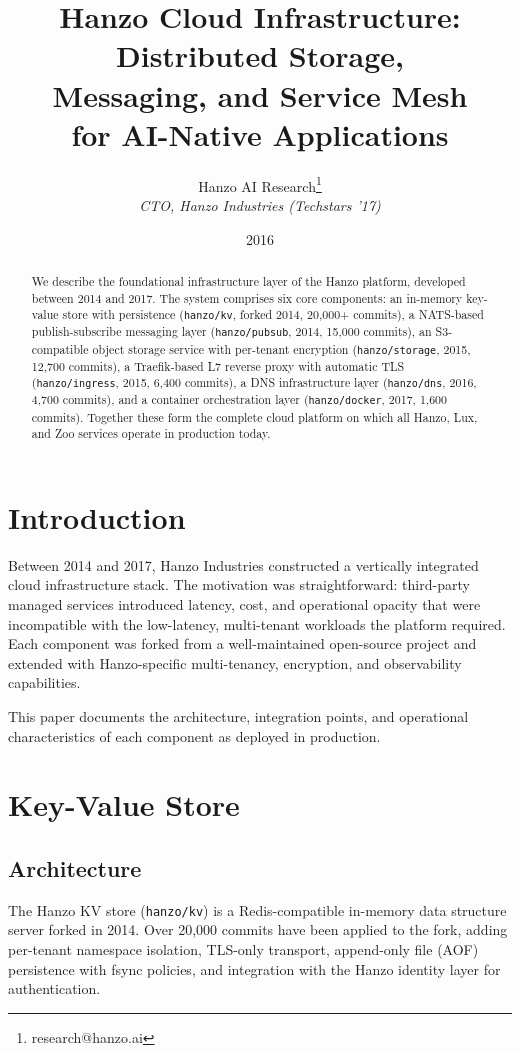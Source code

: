 \documentclass[11pt,a4paper]{article}
\title{Hanzo Cloud Infrastructure: Distributed Storage,\\Messaging, and Service Mesh\\for AI-Native Applications}
\author{Hanzo AI Research\thanks{research@hanzo.ai} \\ \textit{CTO, Hanzo Industries (Techstars '17)}}
\date{2016}
\begin{document}
\hanzocoverpage

\begin{abstract}
We describe the foundational infrastructure layer of the Hanzo platform, developed between 2014 and 2017. The system comprises six core components: an in-memory key-value store with persistence (\texttt{hanzo/kv}, forked 2014, 20{,}000+ commits), a NATS-based publish-subscribe messaging layer (\texttt{hanzo/pubsub}, 2014, 15{,}000 commits), an S3-compatible object storage service with per-tenant encryption (\texttt{hanzo/storage}, 2015, 12{,}700 commits), a Traefik-based L7 reverse proxy with automatic TLS (\texttt{hanzo/ingress}, 2015, 6{,}400 commits), a DNS infrastructure layer (\texttt{hanzo/dns}, 2016, 4{,}700 commits), and a container orchestration layer (\texttt{hanzo/docker}, 2017, 1{,}600 commits). Together these form the complete cloud platform on which all Hanzo, Lux, and Zoo services operate in production today.
\end{abstract}

\section{Introduction}

Between 2014 and 2017, Hanzo Industries constructed a vertically integrated cloud infrastructure stack. The motivation was straightforward: third-party managed services introduced latency, cost, and operational opacity that were incompatible with the low-latency, multi-tenant workloads the platform required. Each component was forked from a well-maintained open-source project and extended with Hanzo-specific multi-tenancy, encryption, and observability capabilities.

This paper documents the architecture, integration points, and operational characteristics of each component as deployed in production.

\section{Key-Value Store}

\subsection{Architecture}

The Hanzo KV store (\texttt{hanzo/kv}) is a Redis-compatible in-memory data structure server forked in 2014. Over 20{,}000 commits have been applied to the fork, adding per-tenant namespace isolation, TLS-only transport, append-only file (AOF) persistence with fsync policies, and integration with the Hanzo identity layer for authentication.
\end{document}

